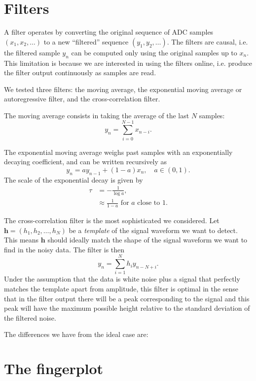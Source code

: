 \section{Filters}

A filter operates by converting the original sequence of ADC samples $(x_1,
x_2, \ldots)$ to a new ``filtered'' sequence $(y_1, y_2, \ldots)$. The filters
are causal, i.e. the filtered sample $y_n$ can be computed only using the
original samples up to $x_n$. This limitation is because we are interested in
using the filters online, i.e. produce the filter output continuously as
samples are read.

We tested three filters: the moving average, the exponential moving average or autoregressive filter, and the cross-correlation filter.

The moving average consists in taking the average of the last $N$ samples:
\begin{equation}
    y_n = \sum_{i=0}^{N-1} x_{n-i}.
\end{equation}

The exponential moving average weighs past samples with an exponentially decaying coefficient, and can be written recursively as
\begin{equation}
    y_n = a y_{n-1} + (1 - a) x_n, \quad a \in (0, 1).
\end{equation}
The scale of the exponential decay is given by
\begin{align}
    \tau &= -\frac1{\log a},\\
    &\approx \frac1{1-a} \text{ for $a$ close to 1.}
\end{align}

The cross-correlation filter is the most sophisticated we considered. Let $\mathbf h = (h_1, h_2, \ldots, h_N)$ be a \emph{template} of the signal waveform we want to detect. This means $\mathbf h$ should ideally match the shape of the signal waveform we want to find in the noisy data. The filter is then
\begin{equation}
    y_n = \sum_{i=1}^N h_i y_{n-N+i}.
\end{equation}
Under the assumption that the data is white noise plus a signal that perfectly matches the template apart from amplitude, this filter is optimal in the sense that in the filter output there will be a peak corresponding to the signal and this peak will have the maximum possible height relative to the standard deviation of the filtered noise.

The differences we have from the ideal case are:

\section{The fingerplot}
